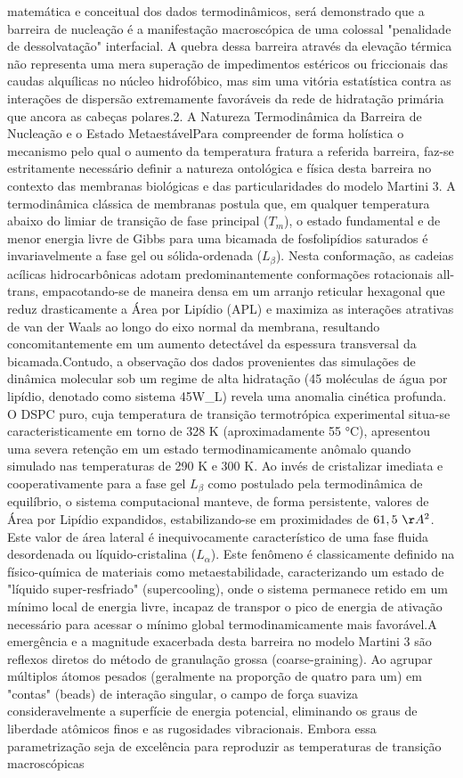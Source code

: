 matemática e conceitual dos dados termodinâmicos, será demonstrado que a barreira de nucleação é a manifestação macroscópica de uma colossal "penalidade de dessolvatação" interfacial. A quebra dessa barreira através da elevação térmica não representa uma mera superação de impedimentos estéricos ou friccionais das caudas alquílicas no núcleo hidrofóbico, mas sim uma vitória estatística contra as interações de dispersão extremamente favoráveis da rede de hidratação primária que ancora as cabeças polares.2. A Natureza Termodinâmica da Barreira de Nucleação e o Estado MetaestávelPara compreender de forma holística o mecanismo pelo qual o aumento da temperatura fratura a referida barreira, faz-se estritamente necessário definir a natureza ontológica e física desta barreira no contexto das membranas biológicas e das particularidades do modelo Martini 3. A termodinâmica clássica de membranas postula que, em qualquer temperatura abaixo do limiar de transição de fase principal ($T_m$), o estado fundamental e de menor energia livre de Gibbs para uma bicamada de fosfolipídios saturados é invariavelmente a fase gel ou sólida-ordenada ($L_{\beta}$). Nesta conformação, as cadeias acílicas hidrocarbônicas adotam predominantemente conformações rotacionais all-trans, empacotando-se de maneira densa em um arranjo reticular hexagonal que reduz drasticamente a Área por Lipídio (APL) e maximiza as interações atrativas de van der Waals ao longo do eixo normal da membrana, resultando concomitantemente em um aumento detectável da espessura transversal da bicamada.Contudo, a observação dos dados provenientes das simulações de dinâmica molecular sob um regime de alta hidratação (45 moléculas de água por lipídio, denotado como sistema 45W\_L) revela uma anomalia cinética profunda. O DSPC puro, cuja temperatura de transição termotrópica experimental situa-se caracteristicamente em torno de 328 K (aproximadamente 55 °C), apresentou uma severa retenção em um estado termodinamicamente anômalo quando simulado nas temperaturas de 290 K e 300 K. Ao invés de cristalizar imediata e cooperativamente para a fase gel $L_{\beta}$ como postulado pela termodinâmica de equilíbrio, o sistema computacional manteve, de forma persistente, valores de Área por Lipídio expandidos, estabilizando-se em proximidades de $61,5~\AA^2$. Este valor de área lateral é inequivocamente característico de uma fase fluida desordenada ou líquido-cristalina ($L_{\alpha}$). Este fenômeno é classicamente definido na físico-química de materiais como metaestabilidade, caracterizando um estado de "líquido super-resfriado" (supercooling), onde o sistema permanece retido em um mínimo local de energia livre, incapaz de transpor o pico de energia de ativação necessário para acessar o mínimo global termodinamicamente mais favorável.A emergência e a magnitude exacerbada desta barreira no modelo Martini 3 são reflexos diretos do método de granulação grossa (coarse-graining). Ao agrupar múltiplos átomos pesados (geralmente na proporção de quatro para um) em "contas" (beads) de interação singular, o campo de força suaviza consideravelmente a superfície de energia potencial, eliminando os graus de liberdade atômicos finos e as rugosidades vibracionais. Embora essa parametrização seja de excelência para reproduzir as temperaturas de transição macroscópicas 